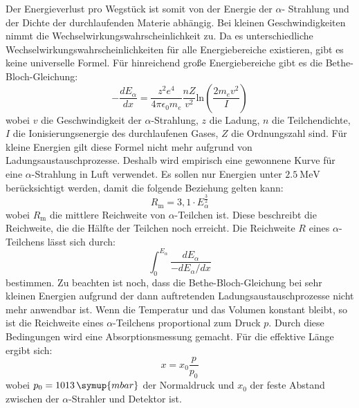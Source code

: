 Der Energieverlust pro Wegstück ist somit von der Energie der $\alpha$- Strahlung und der Dichte der durchlaufenden Materie abhängig. Bei kleinen Geschwindigkeiten nimmt die Wechselwirkungswahrscheinlichkeit zu.
Da es unterschiedliche Wechselwirkungswahrscheinlichkeiten für alle Energiebereiche existieren, gibt es keine universelle Formel. Für hinreichend große Energiebereiche gibt es die Bethe-Bloch-Gleichung:
\begin{equation*}
-\frac{dE_\alpha}{dx} = \frac{z^2e^4}{4 \pi \epsilon_0 m_e}\frac{nZ}{v^2}\text{ln}\left(\frac{2 m_e v^2}{I}\right)
\end{equation*}
wobei $v$ die Geschwindigkeit der $\alpha$-Strahlung, $z$ die Ladung, $n$ die Teilchendichte, $I$ die Ionisierungsenergie des durchlaufenen Gases, $Z$ die Ordnungszahl sind. Für kleine Energien gilt diese Formel nicht mehr aufgrund von Ladungsaustauschprozesse. Deshalb wird empirisch eine gewonnene Kurve für eine $\alpha$-Strahlung in Luft verwendet. Es sollen nur Energien unter $\SI{2,5}{\mega\electronvolt}$ berücksichtigt werden, damit die folgende Beziehung gelten kann:
\begin{equation}
R_\text{m} = 3,1 \cdot E^{\frac{3}{2}}_{\alpha}
\label{eq:reichweiteenergie}
\end{equation}
wobei $R_\text{m}$ die mittlere Reichweite von $\alpha$-Teilchen ist. Diese beschreibt die Reichweite, die die Hälfte der Teilchen noch erreicht. Die Reichweite $R$ eines $\alpha$-Teilchens lässt sich durch:
\begin{equation*}
\int_0^{E_\alpha} \frac{dE_\alpha}{-dE_\alpha/dx}
\end{equation*}
bestimmen. Zu beachten ist noch, dass die Bethe-Bloch-Gleichung bei sehr kleinen Energien aufgrund der dann auftretenden Ladungsaustauschprozesse nicht mehr anwendbar ist.
Wenn die Temperatur und das Volumen konstant bleibt, so ist die Reichweite eines $\alpha$-Teilchens proportional zum Druck $p$. Durch diese Bedingungen wird eine Absorptionsmessung gemacht. Für die effektive Länge ergibt sich:
\begin{equation}
x = x_0 \frac{p}{p_0}
\label{eq:reichweite}
\end{equation}
wobei $p_0 = 1013\,\symup{mbar}$ der Normaldruck und $x_0$ der feste Abstand zwischen der $\alpha$-Strahler und Detektor ist. 